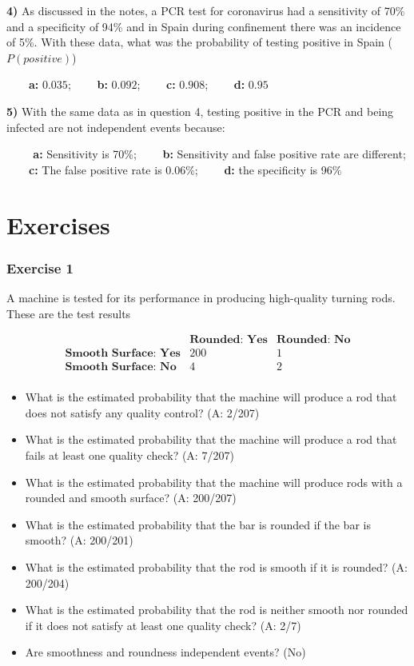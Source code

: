 \documentclass[
]{book}
\begin{document}
\textbf{4)} As discussed in the notes, a PCR test for coronavirus had a sensitivity of 70\% and a specificity of 94\% and in Spain during confinement there was an incidence of 5\%. With these data, what was the probability of testing positive in Spain (\(P(positive)\))

\textbf{\(\qquad\)a:} \(0.035\); \textbf{\(\qquad\)b:} \(0.092\); \textbf{\(\qquad\)c:} \(0.908\); \textbf{\(\qquad\)d:} \(0.95\)

\textbf{5)} With the same data as in question 4, testing positive in the PCR and being infected are not independent events because:

\textbf{\(\qquad\) a:} Sensitivity is 70\%;
\textbf{\(\qquad\)b:} Sensitivity and false positive rate are different;
\textbf{\(\qquad\)c:} The false positive rate is 0.06\%; \textbf{\(\qquad\)d:} the specificity is 96\%

\hypertarget{exercises-2}{%
\section{Exercises}\label{exercises-2}}

\hypertarget{exercise-1-1}{%
\subsubsection{Exercise 1}\label{exercise-1-1}}

A machine is tested for its performance in producing high-quality turning rods. These are the test results

\[
\begin{array}{ccc}
 & \textbf{Rounded: Yes} & \textbf{Rounded: No} \\
\textbf{Smooth Surface: Yes} & 200 & 1 \\
\textbf{Smooth Surface: No} & 4 & 2 \\
\end{array}
\]

\begin{itemize}
\item
  What is the estimated probability that the machine will produce a rod that does not satisfy any quality control? (A: 2/207)
\item
  What is the estimated probability that the machine will produce a rod that fails at least one quality check? (A: 7/207)
\item
  What is the estimated probability that the machine will produce rods with a rounded and smooth surface? (A: 200/207)
\item
  What is the estimated probability that the bar is rounded if the bar is smooth? (A: 200/201)
\item
  What is the estimated probability that the rod is smooth if it is rounded? (A: 200/204)
\item
  What is the estimated probability that the rod is neither smooth nor rounded if it does not satisfy at least one quality check? (A: 2/7)
\item
  Are smoothness and roundness independent events? (No)
\end{itemize}
\end{document}
